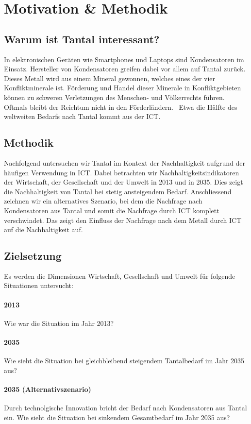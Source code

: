 \section{Motivation \& Methodik}\label{sec:motivation}

\subsection{Warum ist Tantal interessant?}

In elektronischen Geräten wie Smartphones und Laptops sind Kondensatoren im Einsatz.
Hersteller von Kondensatoren greifen dabei vor allem auf Tantal zurück. Dieses Metall wird aus einem Mineral gewonnen, welches eines der vier Konfliktminerale ist.
Förderung und Handel dieser Minerale in Konfliktgebieten können zu schweren Verletzungen des Menschen- und Völkerrechts führen. Oftmals bleibt der Reichtum nicht in den Förderländern.~\cite{conflict_minerals}
Etwa die Hälfte des weltweiten Bedarfs nach Tantal kommt aus der ICT.~\cite{why_tantal}

\subsection{Methodik}

Nachfolgend untersuchen wir Tantal im Kontext der Nachhaltigkeit aufgrund der häufigen Verwendung in ICT. Dabei betrachten wir Nachhaltigkeitsindikatoren der Wirtschaft, der Gesellschaft und der Umwelt in 2013 und in 2035. Dies zeigt die Nachhaltigkeit von Tantal bei stetig ansteigendem Bedarf.
Anschliessend zeichnen wir ein alternatives Szenario, bei dem die Nachfrage nach Kondensatoren aus Tantal und somit die Nachfrage durch ICT komplett verschwindet. Das zeigt den Einfluss der Nachfrage nach dem Metall durch ICT auf die Nachhaltigkeit auf.

\subsection{Zielsetzung}

Es werden die Dimensionen Wirtschaft, Gesellschaft und Umwelt für folgende Situationen untersucht:

\paragraph{2013}
Wie war die Situation im Jahr 2013?
\paragraph{2035}
Wie sieht die Situation bei gleichbleibend steigendem Tantalbedarf im Jahr 2035 aus?
\paragraph{2035 (Alternativszenario)}
Durch technolgische Innovation bricht der Bedarf nach Kondensatoren aus Tantal ein. Wie sieht die Situation bei sinkendem Gesamtbedarf im Jahr 2035 aus?
